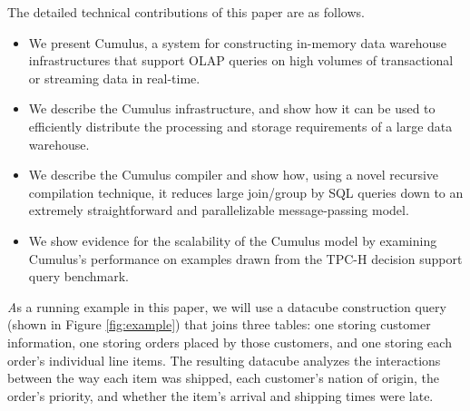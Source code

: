 The detailed technical contributions of this paper are as follows.
\begin{itemize}
\item We present Cumulus, a system for constructing in-memory data warehouse infrastructures that support OLAP queries on high volumes of transactional or streaming data in real-time.

\item We describe the Cumulus infrastructure, and show how it can be used to efficiently distribute the processing and storage requirements of a large data warehouse.

\item We describe the Cumulus compiler and show how, using a novel recursive compilation technique, it reduces large join/group by SQL queries down to an extremely straightforward and parallelizable message-passing model. 

\item We show evidence for the scalability of the Cumulus model by examining Cumulus's performance on examples drawn from the TPC-H\cite{tpch2008} decision support query benchmark. 
\end{itemize}

\begin{example}\textit
As a running example in this paper, we will use a datacube construction query (shown in Figure \ref{fig:example}) that joins three tables: one storing customer information, one storing orders placed by those customers, and one storing each order's individual line items.  The resulting datacube analyzes the interactions between the way each item was shipped, each customer's nation of origin, the order's priority, and whether the item's arrival and shipping times were late.
\end{example}


